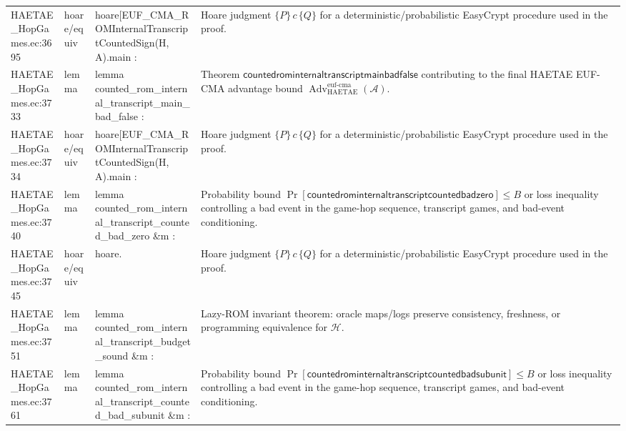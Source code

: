 \documentclass[10pt]{article}
\newcommand{\Adv}{\operatorname{Adv}}
\begin{document}
\begin{longtable}{L{0.11\textwidth}L{0.055\textwidth}L{0.385\textwidth}L{0.41\textwidth}}
HAETAE\_\allowbreak{}HopGames.\allowbreak{}ec:\allowbreak{}3695 & hoare/equiv & {\ttfamily\scriptsize hoare[EUF\_\allowbreak{}CMA\_\allowbreak{}ROMInternalTranscriptCountedSign(H, A).main :} & Hoare judgment $\{P\}\,c\,\{Q\}$ for a deterministic/probabilistic EasyCrypt procedure used in the proof. \\
HAETAE\_\allowbreak{}HopGames.\allowbreak{}ec:\allowbreak{}3733 & lemma & {\ttfamily\scriptsize lemma counted\_\allowbreak{}rom\_\allowbreak{}internal\_\allowbreak{}transcript\_\allowbreak{}main\_\allowbreak{}bad\_\allowbreak{}false :} & Theorem $\mathsf{countedrominternaltranscriptmainbadfalse}$ contributing to the final HAETAE EUF-CMA advantage bound $\Adv_{\mathrm{HAETAE}}^{\mathrm{euf\mbox{-}cma}}(\mathcal A)$. \\
HAETAE\_\allowbreak{}HopGames.\allowbreak{}ec:\allowbreak{}3734 & hoare/equiv & {\ttfamily\scriptsize hoare[EUF\_\allowbreak{}CMA\_\allowbreak{}ROMInternalTranscriptCountedSign(H, A).main :} & Hoare judgment $\{P\}\,c\,\{Q\}$ for a deterministic/probabilistic EasyCrypt procedure used in the proof. \\
HAETAE\_\allowbreak{}HopGames.\allowbreak{}ec:\allowbreak{}3740 & lemma & {\ttfamily\scriptsize lemma counted\_\allowbreak{}rom\_\allowbreak{}internal\_\allowbreak{}transcript\_\allowbreak{}counted\_\allowbreak{}bad\_\allowbreak{}zero \&m :} & Probability bound $\Pr[\mathsf{countedrominternaltranscriptcountedbadzero}]\le B$ or loss inequality controlling a bad event in the game-hop sequence, transcript games, and bad-event conditioning. \\
HAETAE\_\allowbreak{}HopGames.\allowbreak{}ec:\allowbreak{}3745 & hoare/equiv & {\ttfamily\scriptsize hoare.} & Hoare judgment $\{P\}\,c\,\{Q\}$ for a deterministic/probabilistic EasyCrypt procedure used in the proof. \\
HAETAE\_\allowbreak{}HopGames.\allowbreak{}ec:\allowbreak{}3751 & lemma & {\ttfamily\scriptsize lemma counted\_\allowbreak{}rom\_\allowbreak{}internal\_\allowbreak{}transcript\_\allowbreak{}budget\_\allowbreak{}sound \&m :} & Lazy-ROM invariant theorem: oracle maps/logs preserve consistency, freshness, or programming equivalence for $\mathcal H$. \\
HAETAE\_\allowbreak{}HopGames.\allowbreak{}ec:\allowbreak{}3761 & lemma & {\ttfamily\scriptsize lemma counted\_\allowbreak{}rom\_\allowbreak{}internal\_\allowbreak{}transcript\_\allowbreak{}counted\_\allowbreak{}bad\_\allowbreak{}subunit \&m :} & Probability bound $\Pr[\mathsf{countedrominternaltranscriptcountedbadsubunit}]\le B$ or loss inequality controlling a bad event in the game-hop sequence, transcript games, and bad-event conditioning. \\

\end{longtable}
\end{document}
